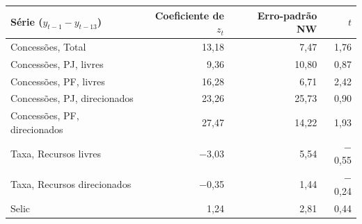 \begin{tabular}{lrrr}
\toprule
Série ($y_{t-1}-y_{t-13}$) & Coeficiente de $z_t$ & Erro-padrão NW & $t$ \\
\midrule
Concessões, Total & 13{,}18 & 7{,}47 & 1{,}76 \\
Concessões, PJ, livres & 9{,}36 & 10{,}80 & 0{,}87 \\
Concessões, PF, livres & 16{,}28 & 6{,}71 & 2{,}42 \\
Concessões, PJ, direcionados & 23{,}26 & 25{,}73 & 0{,}90 \\
Concessões, PF, direcionados & 27{,}47 & 14{,}22 & 1{,}93 \\
Taxa, Recursos livres & \ensuremath{-}3{,}03 & 5{,}54 & \ensuremath{-}0{,}55 \\
Taxa, Recursos direcionados & \ensuremath{-}0{,}35 & 1{,}44 & \ensuremath{-}0{,}24 \\
Selic & 1{,}24 & 2{,}81 & 0{,}44 \\
\bottomrule
\end{tabular}
